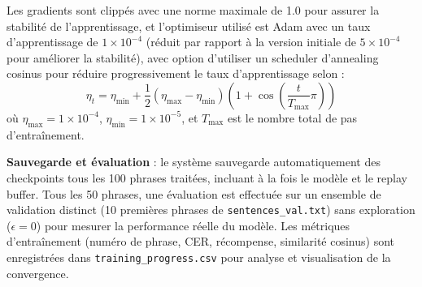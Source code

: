 \begin{enumerate}
    Les gradients sont clippés avec une norme maximale de 1.0 pour assurer la stabilité de l'apprentissage, et l'optimiseur utilisé est Adam avec un taux d'apprentissage de $1 \times 10^{-4}$ (réduit par rapport à la version initiale de $5 \times 10^{-4}$ pour améliorer la stabilité), avec option d'utiliser un scheduler d'annealing cosinus pour réduire progressivement le taux d'apprentissage selon :
    \[
    \eta_t = \eta_{\min} + \frac{1}{2}(\eta_{\max} - \eta_{\min})\left(1 + \cos\left(\frac{t}{T_{\max}}\pi\right)\right)
    \]
    où $\eta_{\max} = 1 \times 10^{-4}$, $\eta_{\min} = 1 \times 10^{-5}$, et $T_{\max}$ est le nombre total de pas d'entraînement.
    
    \textbf{Sauvegarde et évaluation} : le système sauvegarde automatiquement des checkpoints tous les 100 phrases traitées, incluant à la fois le modèle et le replay buffer. Tous les 50 phrases, une évaluation est effectuée sur un ensemble de validation distinct (10 premières phrases de \texttt{sentences\_val.txt}) sans exploration ($\epsilon = 0$) pour mesurer la performance réelle du modèle. Les métriques d'entraînement (numéro de phrase, CER, récompense, similarité cosinus) sont enregistrées dans \texttt{training\_progress.csv} pour analyse et visualisation de la convergence.
    
\end{enumerate}
